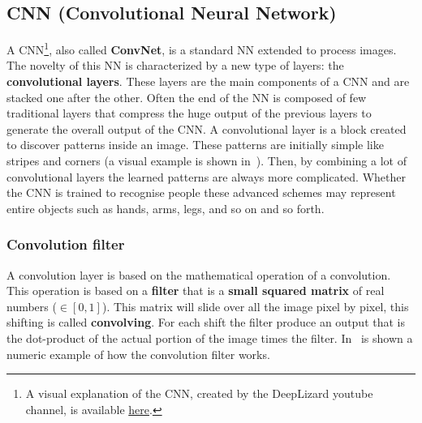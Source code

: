 \subsection{CNN (Convolutional Neural Network)} \label{sec:cnn}
A CNN\footnote{A visual explanation of the CNN, created by the DeepLizard youtube channel, is available \href{https://www.youtube.com/watch?v=YRhxdVk_sIs}{here}.}, also called \textbf{ConvNet}, is a standard NN extended to process images.\\
The novelty of this NN is characterized by a new type of layers: the \textbf{convolutional layers}. These layers are the main components of a CNN and are stacked one after the other. Often the end of the NN is composed of few traditional layers that compress the huge output of the previous layers to generate the overall output of the CNN. A convolutional layer is a block created to discover patterns inside an image. These patterns are initially simple like stripes and corners (a visual example is shown in~). Then, by combining a lot of convolutional layers the learned patterns are always more complicated. Whether the CNN is trained to recognise people these advanced schemes may represent entire objects such as hands, arms, legs, and so on and so forth.

\subsubsection*{Convolution filter}
A convolution layer is based on the mathematical operation of a convolution.\\
This operation is based on a \textbf{filter} that is a \textbf{small squared matrix} of real numbers ($\in [0, 1]$). This matrix will slide over all the image pixel by pixel, this shifting is called \textbf{convolving}. For each shift the filter produce an output that is the dot-product of the actual portion of the image times the filter. In~ is shown a numeric example of how the convolution filter works.

